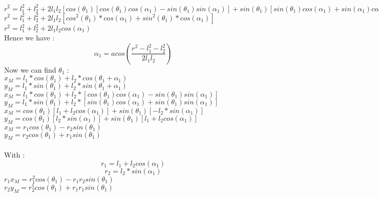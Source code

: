 \documentclass [11pt]{article}
\begin{document}
\linebreak
$r^2 = l_1^2 + l_2^2 + 2l_1l_2[cos(\theta_1)[cos(\theta_1)cos(\alpha_1) -sin(\theta_1)sin(\alpha_1)] + sin(\theta_1)[sin(\theta_1)cos(\alpha_1) + sin(\alpha_1)cos(\theta_1)]]$\\
\linebreak
$r^2 = l_1^2 + l_2^2 + 2l_1l_2[cos^2(\theta_1)*cos(\alpha_1) + sin^2(\theta_1)*cos(\alpha_1)]$\\
\linebreak
$r^2 = l_1^2 + l_2^2 + 2l_1l_2cos(\alpha_1)$\\
\linebreak
Hence we have :
\begin{equation}\label{eqn:res1}
     \boxed{\alpha_1 = acos(\frac{r^2-l_1^2-l_2^2}{2l_1l_2})}
\end{equation}
\linebreak
Now we can find $\theta_1$ :\\
\linebreak
$x_M = l_1*cos(\theta_1) + l_2*cos(\theta_1 + \alpha_1)$\\
$y_M = l_1*sin(\theta_1) + l_2*sin(\theta_1 + \alpha_1)$\\
\linebreak
$x_M = l_1*cos(\theta_1) + l_2*[cos(\theta_1)cos(\alpha_1)-sin(\theta_1)sin(\alpha_1)]$\\
$y_M = l_1*sin(\theta_1) + l_2*[sin(\theta_1)cos(\alpha_1) + sin(\theta_1)sin(\alpha_1)]$\\
\linebreak
$x_M = cos(\theta_1)[l_1 + l_2cos(\alpha_1)] + sin(\theta_1)[-l_2*sin(\alpha_1)]$\\
$y_M = cos(\theta_1)[l_2*sin(\alpha_1)] + sin(\theta_1)[l_1 + l_2cos(\alpha_1)]$\\
\linebreak
$x_M = r_1cos(\theta_1) - r_2sin(\theta_1)$\\
$y_M = r_2cos(\theta_1) + r_1sin(\theta_1)$\\\\
With :
\begin{equation}\label{eqn:res2}
     \boxed{r_1 = l_1 + l_2cos(\alpha_1)}
\end{equation}
\begin{equation}\label{eqn:res2}
     \boxed{r_2 = l_2*sin(\alpha_1)}
\end{equation}
\linebreak
$r_1x_M = r^2_1cos(\theta_1) - r_1r_2sin(\theta_1)$\\
$r_2y_M = r^1_2cos(\theta_1) + r_1r_1sin(\theta_1)$\\
\end{document}
